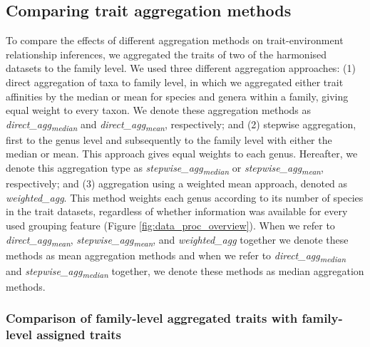 \documentclass[12pt]{article}
\begin{document}

\subsection*{Comparing trait aggregation methods}

To compare the effects of different aggregation methods on trait-environment relationship inferences, we aggregated the traits of two of the harmonised datasets to the family level. We used three different aggregation approaches: (1) direct aggregation of taxa to family level, in which we aggregated either trait affinities by the median or mean for species and genera within a family, giving equal weight to every taxon. We denote these aggregation methods as \textit{direct\_agg\textsubscript{median}} and \textit{direct\_agg\textsubscript{mean}}, respectively; and (2) stepwise aggregation, first to the genus level and subsequently to the family level with either the median or mean. This approach gives equal weights to each genus. Hereafter, we denote this aggregation type as \textit{stepwise\_agg\textsubscript{median}} or \textit{stepwise\_agg\textsubscript{mean}}, respectively; and (3) aggregation using a weighted mean approach, denoted as \textit{weighted\_agg}. This method weights each genus according to its number of species in the trait datasets, regardless of whether information was available for every used grouping feature (Figure \ref{fig:data_proc_overview}). When we refer to \textit{direct\_agg\textsubscript{mean}}, \textit{stepwise\_agg\textsubscript{mean}}, and \textit{weighted\_agg} together we denote these methods as mean aggregation methods and when we refer to \textit{direct\_agg\textsubscript{median}} and \textit{stepwise\_agg\textsubscript{median}} together, we denote these methods as median aggregation methods.


\subsubsection*{Comparison of family-level aggregated traits with family-level assigned traits}
\end{document}
